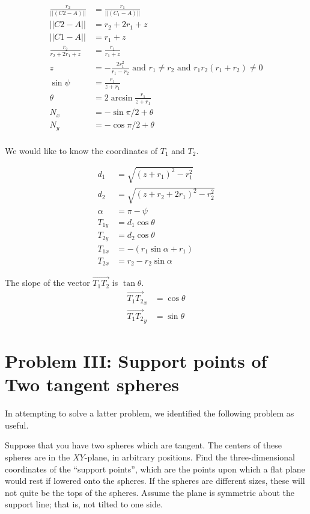 \documentclass{article}
\begin{document}
\begin{align}
\frac{r_2}{||(C2 - A)||} &= \frac{r_1}{||(C_1-A)||} \\
||C2 - A|| &= r_2+2r_1+z \\
||C1 - A|| &= r_1 + z \\
\frac{r_2}{r_2+2r_1+z} &= \frac{r_1}{r_1+z} \\
z &= -\frac{2 r_1^2}{r_1 - r_2} \text{ and } r_1 \neq r_2 \text{ and } r_1 r_2 (r_1 + r_2) \neq 0 \\
\sin{\psi} &= \frac{r_1}{z + r_1} \\
\theta &=2 \arcsin{\frac{r_1}{z+r_1}} \\
N_x &= -\sin{\pi/2 + \theta} \\
N_y &= -\cos{\pi/2 + \theta} \\
\end{align}

We would like to know the coordinates of $T_1$ and $T_2$.

\begin{align}
  d_1 &= \sqrt{(z+r_1)^2 - r_1^2} \\
  d_2 &= \sqrt{(z+r_2+2r_1)^2 - r_2^2} \\
  \alpha &= \pi - \psi \\
  T_{1y} &= d_1\cos{\theta} \\
  T_{2y} &= d_2\cos{\theta} \\
  T_{1x} &= - (r_1\sin{\alpha} + r_1) \\
  T_{2x} &= r_2 - r_2\sin{\alpha}
\end{align}


The slope of the vector $\overrightarrow{T_1T_2}$ is $\tan{\theta}$.
  \begin{align}
    \overrightarrow{T_1T_2}_x &= \cos{\theta} \\
    \overrightarrow{T_1T_2}_y &= \sin{\theta}
    \end{align}

  \section{Problem III: Support points of Two tangent spheres }

  In attempting to solve a latter problem, we identified the following problem as useful.

  Suppose that you have two spheres which are tangent. The centers of these spheres are
  in the $XY$-plane, in arbitrary positions.   Find the three-dimensional coordinates
  of the ``support points'', which are the points upon which a flat plane would rest
  if lowered onto the spheres. If the spheres are different sizes, these will not quite
  be the tops of the spheres.  Assume the plane is symmetric about the support line; that
  is, not tilted to one side.
\end{document}
